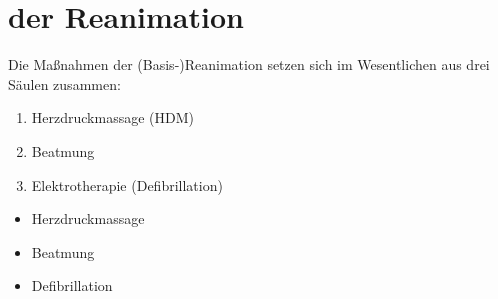 

\section{ der Reanimation}



{Die Maßnahmen der (Basis-)Reanimation setzen sich im
Wesentlichen aus drei Säulen zusammen:
\begin{enumerate}
  \item Herzdruckmassage (HDM)
  \item Beatmung
  \item Elektrotherapie (Defibrillation)
\end{enumerate} }{
\begin{itemize}
  \item Herzdruckmassage
  \item Beatmung
  \item Defibrillation
\end{itemize}
}{}{}{}

